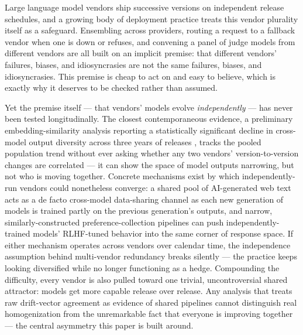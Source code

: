 \documentclass[11pt]{article}
\begin{document}
Large language model vendors ship successive versions on independent release schedules, and a growing body of deployment practice treats this vendor plurality itself as a safeguard. Ensembling across providers, routing a request to a fallback vendor when one is down or refuses, and convening a panel of judge models from different vendors are all built on an implicit premise: that different vendors' failures, biases, and idiosyncrasies are not the same failures, biases, and idiosyncrasies. This premise is cheap to act on and easy to believe, which is exactly why it deserves to be checked rather than assumed.

Yet the premise itself --- that vendors' models evolve \emph{independently} --- has never been tested longitudinally. The closest contemporaneous evidence, a preliminary embedding-similarity analysis reporting a statistically significant decline in cross-model output diversity across three years of releases \citep{SimilarlyCreative2608}, tracks the pooled population trend without ever asking whether any two vendors' version-to-version changes are correlated --- it can show the space of model outputs narrowing, but not who is moving together. Concrete mechanisms exist by which independently-run vendors could nonetheless converge: a shared pool of AI-generated web text acts as a de facto cross-model data-sharing channel as each new generation of models is trained partly on the previous generation's outputs, and narrow, similarly-constructed preference-collection pipelines can push independently-trained models' RLHF-tuned behavior into the same corner of response space. If either mechanism operates across vendors over calendar time, the independence assumption behind multi-vendor redundancy breaks silently --- the practice keeps looking diversified while no longer functioning as a hedge. Compounding the difficulty, every vendor is also pulled toward one trivial, uncontroversial shared attractor: models get more capable release over release. Any analysis that treats raw drift-vector agreement as evidence of shared pipelines cannot distinguish real homogenization from the unremarkable fact that everyone is improving together --- the central asymmetry this paper is built around.
\end{document}
